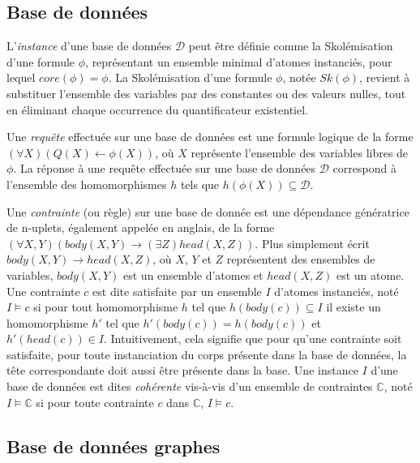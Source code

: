 \subsection{Base de données}
\label{sec:update:pre:db}

\begin{definition}[Instance]
L'\emph{instance} d'une base de données $\mathcal{D}$ peut être définie comme la Skolémisation d'une formule $\phi$, représentant un ensemble minimal d'atomes instanciés, pour lequel $core(\phi) = \phi$.
La Skolémisation d'une formule $\phi$, notée $Sk(\phi)$, revient à substituer l'ensemble des variables par des constantes ou des valeurs nulles, tout en éliminant chaque occurrence du quantificateur existentiel.
\end{definition}

\begin{definition}[Requête]
Une \emph{requête} effectuée sur une base de données est une formule logique de la forme $(\forall X)(Q(X) \gets \phi(X))$, où $X$ représente l'ensemble des variables libres de $\phi$.
La réponse à une requête effectuée sur une base de données $\mathcal{D}$ correspond à l'ensemble des homomorphismes $h$ tels que $h(\phi(X)) \subseteq \mathcal{D}$.
\end{definition}

\begin{definition}[Contrainte]
Une \emph{contrainte} (ou règle) sur une base de donnée est une dépendance génératrice de n-uplets, également appelée  en anglais, de la forme $(\forall X, Y)(body(X, Y) \to (\exists Z)head(X, Z))$.
Plus simplement écrit $body(X, Y) \to head(X, Z)$, où $X$, $Y$ et $Z$ représentent des ensembles de variables, $body(X, Y)$ est un ensemble d'atomes et $head(X, Z)$ est un atome.
Une contrainte $c$ est dite satisfaite par un ensemble $I$ d'atomes instanciés, noté $I \vDash c$ si pour tout homomorphisme $h$ tel que $h(body(c)) \subseteq I$ il existe un homomorphisme $h'$ tel que $h'(body(c)) = h(body(c))$ et $h'(head(c)) \in I$.
Intuitivement, cela signifie que pour qu'une contrainte soit satisfaite, pour toute instanciation du corps présente dans la base de données, la tête correspondante doit aussi être présente dans la base.
Une instance $I$ d'une base de données est dites \emph{cohérente} vis-à-vis d'un ensemble de contraintes $\mathbb{C}$, noté $I \vDash \mathbb{C}$ si pour toute contrainte $c$ dans $\mathbb{C}$, $I \vDash c$.
\end{definition}

\subsection{Base de données graphes}
\label{sec:update:pre:graph}

